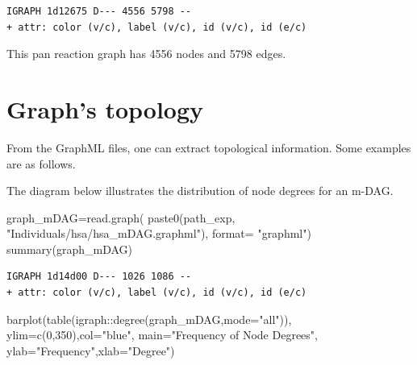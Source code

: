 \documentclass[
  letterpaper,
  DIV=11,
  numbers=noendperiod]{scrreprt}
\newenvironment{Shaded}{}{}
\newcommand{\AttributeTok}[1]{\textcolor[rgb]{0.78,0.47,0.87}{#1}}
\newcommand{\DecValTok}[1]{\textcolor[rgb]{0.82,0.60,0.40}{#1}}
\newcommand{\FunctionTok}[1]{\textcolor[rgb]{0.38,0.69,0.94}{#1}}
\newcommand{\NormalTok}[1]{\textcolor[rgb]{0.67,0.70,0.75}{#1}}
\newcommand{\OtherTok}[1]{\textcolor[rgb]{0.15,0.68,0.38}{#1}}
\newcommand{\SpecialCharTok}[1]{\textcolor[rgb]{0.34,0.71,0.76}{#1}}
\newcommand{\StringTok}[1]{\textcolor[rgb]{0.60,0.76,0.47}{#1}}
\begin{document}
\begin{verbatim}
IGRAPH 1d12675 D--- 4556 5798 -- 
+ attr: color (v/c), label (v/c), id (v/c), id (e/c)
\end{verbatim}

This pan reaction graph has 4556 nodes and 5798 edges.

\section{Graph's topology}\label{graphs-topology}

From the GraphML files, one can extract topological information. Some
examples are as follows.

The diagram below illustrates the distribution of node degrees for an
m-DAG.

\begin{Shaded}
\begin{Highlighting}[]
\NormalTok{graph\_mDAG}\OtherTok{=}\FunctionTok{read.graph}\NormalTok{(}
  \FunctionTok{paste0}\NormalTok{(path\_exp,}
         \StringTok{"Individuals/hsa/hsa\_mDAG.graphml"}\NormalTok{),}
  \AttributeTok{format=} \StringTok{"graphml"}\NormalTok{)}
\FunctionTok{summary}\NormalTok{(graph\_mDAG)}
\end{Highlighting}
\end{Shaded}

\begin{verbatim}
IGRAPH 1d14d00 D--- 1026 1086 -- 
+ attr: color (v/c), label (v/c), id (v/c), id (e/c)
\end{verbatim}

\begin{Shaded}
\begin{Highlighting}[]
\FunctionTok{barplot}\NormalTok{(}\FunctionTok{table}\NormalTok{(igraph}\SpecialCharTok{::}\FunctionTok{degree}\NormalTok{(graph\_mDAG,}\AttributeTok{mode=}\StringTok{"all"}\NormalTok{)),}
        \AttributeTok{ylim=}\FunctionTok{c}\NormalTok{(}\DecValTok{0}\NormalTok{,}\DecValTok{350}\NormalTok{),}\AttributeTok{col=}\StringTok{"blue"}\NormalTok{,}
        \AttributeTok{main=}\StringTok{"Frequency of Node Degrees"}\NormalTok{,}
        \AttributeTok{ylab=}\StringTok{"Frequency"}\NormalTok{,}\AttributeTok{xlab=}\StringTok{"Degree"}\NormalTok{)}
\end{Highlighting}
\end{Shaded}
\end{document}
